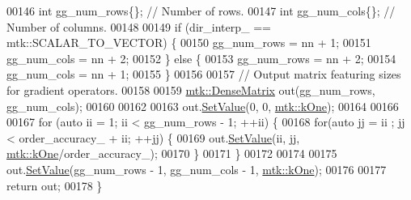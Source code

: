 \begin{DoxyCode}
00146   \textcolor{keywordtype}{int} gg\_num\_rows\{\};  \textcolor{comment}{// Number of rows.}
00147   \textcolor{keywordtype}{int} gg\_num\_cols\{\};  \textcolor{comment}{// Number of columns.}
00148 
00149   \textcolor{keywordflow}{if} (dir\_interp\_ == mtk::SCALAR\_TO\_VECTOR) \{
00150     gg\_num\_rows = nn + 1;
00151     gg\_num\_cols = nn + 2;
00152   \} \textcolor{keywordflow}{else} \{
00153     gg\_num\_rows = nn + 2;
00154     gg\_num\_cols = nn + 1;
00155   \}
00156 
00157   \textcolor{comment}{// Output matrix featuring sizes for gradient operators.}
00158 
00159   \hyperlink{classmtk_1_1DenseMatrix}{mtk::DenseMatrix} out(gg\_num\_rows, gg\_num\_cols);
00160 
00162 
00163   out.\hyperlink{classmtk_1_1DenseMatrix_a784ce5784109ac86bfb9d8562b334b13}{SetValue}(0, 0, \hyperlink{group__c01-roots_ga26407c24d43b6b95480943340d285c71}{mtk::kOne});
00164 
00166 
00167   \textcolor{keywordflow}{for} (\textcolor{keyword}{auto} ii = 1; ii < gg\_num\_rows - 1; ++ii) \{
00168     \textcolor{keywordflow}{for}(\textcolor{keyword}{auto} jj = ii ; jj < order\_accuracy\_ + ii; ++jj) \{
00169       out.\hyperlink{classmtk_1_1DenseMatrix_a784ce5784109ac86bfb9d8562b334b13}{SetValue}(ii, jj, \hyperlink{group__c01-roots_ga26407c24d43b6b95480943340d285c71}{mtk::kOne}/order\_accuracy\_);
00170     \}
00171   \}
00172 
00174 
00175   out.\hyperlink{classmtk_1_1DenseMatrix_a784ce5784109ac86bfb9d8562b334b13}{SetValue}(gg\_num\_rows - 1, gg\_num\_cols - 1, \hyperlink{group__c01-roots_ga26407c24d43b6b95480943340d285c71}{mtk::kOne});
00176 
00177   \textcolor{keywordflow}{return} out;
00178 \}
\end{DoxyCode}
